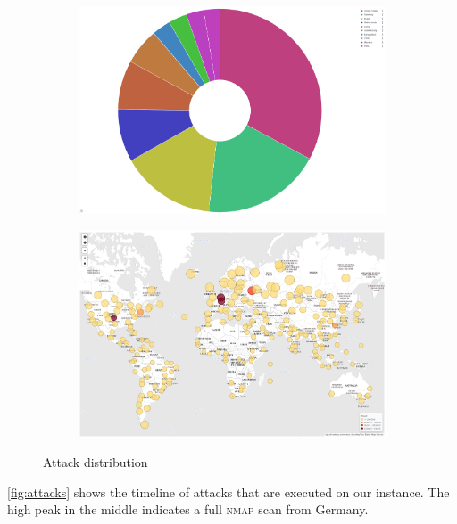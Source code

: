\begin{figure}
    \centering

    \begin{subfigure}[b]{0.49\textwidth}
        \centering
        \includegraphics[width=\textwidth]{figures/tpot-attacks-country.png}
        \caption{}
        \label{fig:tpot-overview-map}
    \end{subfigure}
    \hfill
    \begin{subfigure}[b]{0.49\textwidth}
        \centering
        \includegraphics[width=\textwidth]{figures/tpot-overview-map.png}
        \caption{}
        \label{fig:tpot-attack-country}
    \end{subfigure}
    \caption[Attack distribution]{Attack distribution}
    \label{fig:attack-distribution}
\end{figure}

\autoref{fig:attacks} shows the timeline of attacks that are executed on our instance.
The high peak in the middle indicates a full \textsc{nmap} scan from Germany.


